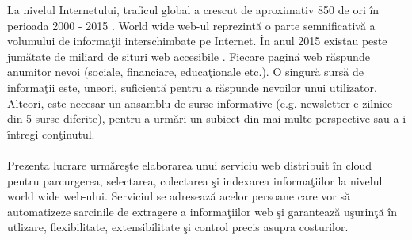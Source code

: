 La nivelul Internetului, traficul global a crescut de aproximativ 850 de ori în perioada 2000 - 2015 \cite{cisco-internet-traffic}. World wide web-ul reprezintă o parte semnificativă a volumului de informaţii interschimbate pe Internet. În anul 2015 existau peste jumătate de miliard de situri web accesibile \cite{http://www.internetlivestats.com/total-number-of-websites/}. Fiecare pagină web răspunde anumitor nevoi (sociale, financiare, educaţionale etc.). O singură sursă de informaţii este, uneori, suficientă pentru a răspunde nevoilor unui utilizator. Alteori, este necesar un ansamblu de surse informative (e.g. newsletter-e zilnice din 5 surse diferite), pentru a urmări un subiect din mai multe perspective sau a-i întregi conţinutul.
\\
\\
Prezenta lucrare urmăreşte elaborarea unui serviciu web distribuit în cloud pentru parcurgerea, selectarea, colectarea şi indexarea informaţiilor la nivelul world wide web-ului. Serviciul se adresează acelor persoane care vor să automatizeze sarcinile de extragere a informaţiilor web şi garantează uşurinţă în utlizare, flexibilitate, extensibilitate şi control precis asupra costurilor.
